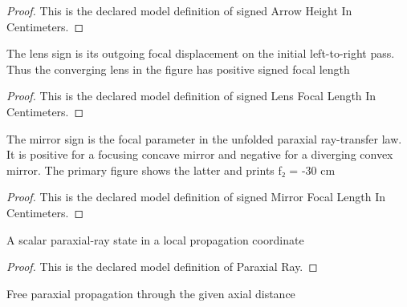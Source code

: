\begin{proof}
  This is the declared model definition of signed Arrow Height In Centimeters.
\end{proof}
\begin{definition}
  \label{def:physics:phyx-mini-0077:phyxminiproblems-problemphyxmini0077-signedlensfocallengthincentimeters}
  The lens sign is its outgoing focal displacement on the initial left-to-right pass. Thus the converging lens in the figure has positive signed focal length
\end{definition}
\begin{proof}
  This is the declared model definition of signed Lens Focal Length In Centimeters.
\end{proof}
\begin{definition}
  \label{def:physics:phyx-mini-0077:phyxminiproblems-problemphyxmini0077-signedmirrorfocallengthincentimeters}
  The mirror sign is the focal parameter in the unfolded paraxial ray-transfer law. It is positive for a focusing concave mirror and negative for a diverging convex mirror. The primary figure shows the latter and prints f₂ = -30 cm
\end{definition}
\begin{proof}
  This is the declared model definition of signed Mirror Focal Length In Centimeters.
\end{proof}
\begin{definition}
  \label{def:physics:phyx-mini-0077:phyxminiproblems-problemphyxmini0077-paraxialray}
  A scalar paraxial-ray state in a local propagation coordinate
\end{definition}
\begin{proof}
  This is the declared model definition of Paraxial Ray.
\end{proof}
\begin{definition}
  \label{def:physics:phyx-mini-0077:phyxminiproblems-problemphyxmini0077-propagateparaxialray}
  Free paraxial propagation through the given axial distance
\end{definition}
